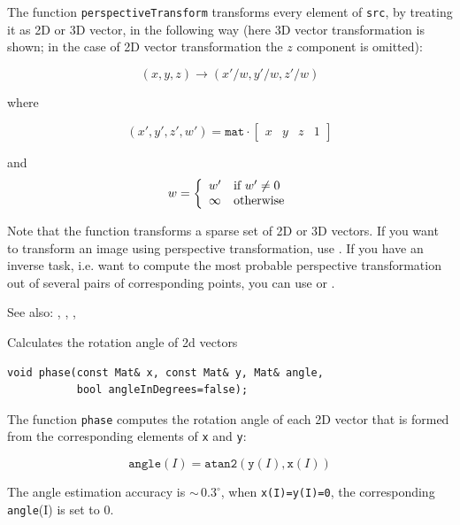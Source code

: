 The function \texttt{perspectiveTransform} transforms every element of \texttt{src},
by treating it as 2D or 3D vector, in the following way (here 3D vector transformation is shown; in the case of 2D vector transformation the $z$ component is omitted):

\[ (x, y, z) \rightarrow (x'/w, y'/w, z'/w) \]

where

\[
(x', y', z', w') = \texttt{mat} \cdot
\begin{bmatrix} x & y & z & 1 \end{bmatrix}
\]

and
\[ w = \left\{ \begin{array}{l l} w' & \mbox{if $w' \ne 0$}\\ \infty & \mbox{otherwise}\\ \end{array} \right. \]

Note that the function transforms a sparse set of 2D or 3D vectors. If you want to transform an image using perspective transformation, use . If you have an inverse task, i.e. want to compute the most probable perspective transformation out of several pairs of corresponding points, you can use  or .

See also: , , , 

\label{phase}
Calculates the rotation angle of 2d vectors

\begin{lstlisting}
void phase(const Mat& x, const Mat& y, Mat& angle,
           bool angleInDegrees=false);
\end{lstlisting}
\begin{description}
\end{description}

The function \texttt{phase} computes the rotation angle of each 2D vector that is formed from the corresponding elements of \texttt{x} and \texttt{y}:

\[\texttt{angle}(I) = \texttt{atan2}(\texttt{y}(I), \texttt{x}(I))\]

The angle estimation accuracy is $\sim\,0.3^\circ$, when \texttt{x(I)=y(I)=0}, the corresponding \texttt{angle}(I) is set to $0$.

